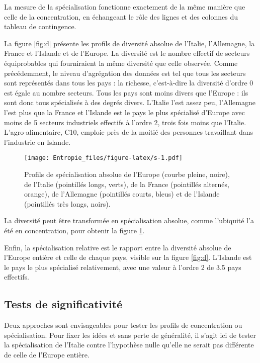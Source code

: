 \documentclass[fleqn,10pt]{ArtEcoFoG} %
\begin{document}
La mesure de la spécialisation fonctionne exactement de la même manière
que celle de la concentration, en échangeant le rôle des lignes et des
colonnes du tableau de contingence.

La figure \ref{fig:d} présente les profils de diversité absolue de
l'Italie, l'Allemagne, la France et l'Islande et de l'Europe. La
diversité est le nombre effectif de secteurs équiprobables qui
fourniraient la même diversité que celle observée. Comme précédemment,
le niveau d'agrégation des données est tel que tous les secteurs sont
représentés dans tous les pays : la richesse, c'est-à-dire la diversité
d'ordre 0 est égale au nombre secteurs. Tous les pays sont moins divers
que l'Europe : ils sont donc tous spécialisés à des degrés divers.
L'Italie l'est assez peu, l'Allemagne l'est plus que la France et
l'Islande est le pays le plus spécialisé d'Europe avec moins de 5
secteurs industriels effectifs à l'ordre 2, trois fois moins que
l'Italie. L'agro-alimentaire, C10, emploie près de la moitié des
personnes travaillant dans l'industrie en Islande.

\begin{figure}
\centering
\texttt{[image: Entropie\_files/figure-latex/s-1.pdf]}
\caption{\label{fig:s}Profils de spécialisation absolue de l'Europe (courbe
pleine, noire), de l'Italie (pointillés longs, verts), de la France
(pointillés alternés, orange), de l'Allemagne (pointillés courts, bleus)
et de l'Islande (pointillés très longs, noirs).}
\end{figure}

La diversité peut être transformée en spécialisation absolue, comme
l'ubiquité l'a été en concentration, pour obtenir la figure \ref{fig:s}.

Enfin, la spécialisation relative est le rapport entre la diversité
absolue de l'Europe entière et celle de chaque pays, visible sur la
figure \ref{fig:d}. L'Islande est le pays le plus spécialisé
relativement, avec une valeur à l'ordre 2 de 3.5 pays effectifs.

\subsection{Tests de significativité}\label{tests-de-significativite}

Deux approches sont envisageables pour tester les profils de
concentration ou spécialisation. Pour fixer les idées et sans perte de
généralité, il s'agit ici de tester la spécialisation de l'Italie contre
l'hypothèse nulle qu'elle ne serait pas différente de celle de l'Europe
entière.
\end{document}
